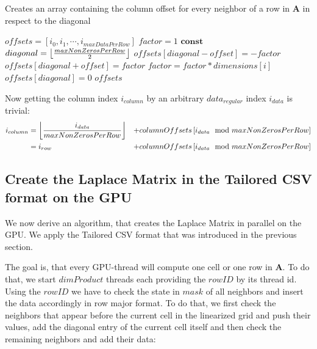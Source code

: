 \begin{algorithm}
\caption{Creates an array containing the column offset for every neighbor of a row in \textbf{A} in respect to the diagonal}\label{diagonalOffsets}
\begin{algorithmic}[1]
	\State $offsets = \left[ i_0, i_1, \cdots, i_{maxDataPerRow} \right]$  
	\State $factor = 1$
	\State $\mathbf{const}$ $diagonal = \floor*{\frac{maxNonZerosPerRow}{2}}$
	\State 
    	\State $offsets[diagonal - offset] = -factor$
        \State $offsets[diagonal + offset] = factor$
        \State $factor = factor * dimensions[i]$
	\EndFor
	\State $offsets[diagonal] = 0$
	\State \Return $offsets$
	
\EndFunction
\end{algorithmic}
\end{algorithm}
Now getting the column index $i_{column}$ by an arbitrary $data_{regular}$ index $i_{data}$ is trivial:
\begin{equation}
\begin{aligned}
	i_{column} & = \floor*{\frac{i_{data}}{maxNonZerosPerRow}} & + columnOffsets\left[ i_{data} \mod maxNonZerosPerRow \right]\\
			   & = i_{row} & + columnOffsets\left[ i_{data} \mod maxNonZerosPerRow \right]\\
\end{aligned}
\end{equation}


\subsection{Create the Laplace Matrix in the Tailored CSV format on the GPU}\label{laplace-creation}
We now derive an algorithm, that creates the Laplace Matrix in parallel on the GPU. We apply the Tailored CSV format that was introduced in the previous section. 
\par The goal is, that every GPU-thread will compute one cell or one row in \textbf{A}. To do that, we start  $dimProduct$ threads each providing the $rowID$ by its thread id. Using the $rowID$ we have to check the state in $mask$ of all neighbors and insert the data accordingly in row major format. To do that, we first check the neighbors that appear before the current cell in the linearized grid and push their values, add the diagonal entry of the current cell itself and then check the remaining neighbors and add their data:

